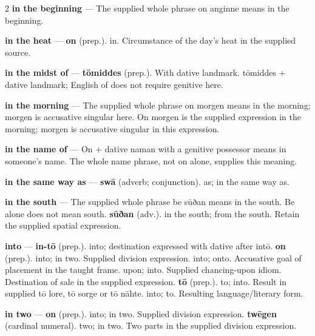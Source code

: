 \begin{multicols}{2}
\textbf{in the beginning} — The supplied whole phrase on anginne means in the beginning.\par
\textbf{in the heat} — \textbf{on} (prep.). in. Circumstance of the day's heat in the supplied source.\par
\textbf{in the midst of} — \textbf{tōmiddes} (prep.). With dative landmark. tōmiddes + dative landmark; English of does not require genitive here.\par
\textbf{in the morning} — The supplied whole phrase on morgen means in the morning; morgen is accusative singular here. On morgen is the supplied expression in the morning; morgen is accusative singular in this expression.\par
\textbf{in the name of} — On + dative naman with a genitive possessor means in someone’s name. The whole name phrase, not on alone, supplies this meaning.\par
\textbf{in the same way as} — \textbf{swā} (adverb; conjunction). as; in the same way as.\par
\textbf{in the south} — The supplied whole phrase be sūðan means in the south. Be alone does not mean south. \textbf{sūðan} (adv.). in the south; from the south. Retain the supplied spatial expression.\par
\textbf{into} — \textbf{in-tō} (prep.). into; destination expressed with dative after intō. \textbf{on} (prep.). into; in two. Supplied division expression. into; onto. Accusative goal of placement in the taught frame. upon; into. Supplied chancing-upon idiom. Destination of sale in the supplied expression. \textbf{tō} (prep.). to; into. Result in supplied tō lore, tō sorge or tō nāhte. into; to. Resulting language/literary form.\par
\textbf{in two} — \textbf{on} (prep.). into; in two. Supplied division expression. \textbf{twēgen} (cardinal numeral). two; in two. Two parts in the supplied division expression.\par

\end{multicols}
